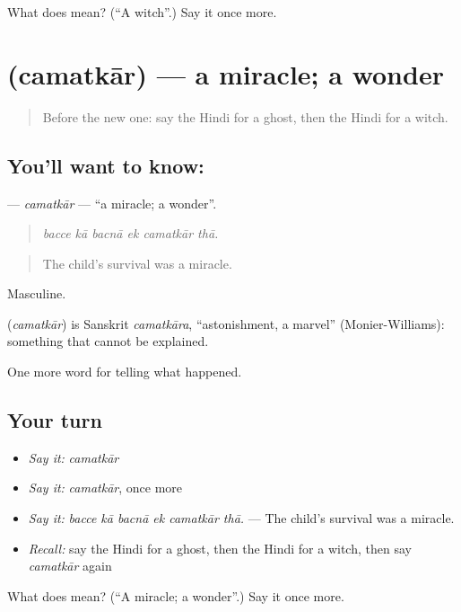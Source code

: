 \begin{tcolorbox}[breakable,colback=teal!4,colframe=teal!35!black,title={Before you move on}]
What does  mean? (\textquotedblleft{}A witch\textquotedblright{}.) Say it once more.
\end{tcolorbox}
\section[\texorpdfstring{\hi{चमत्कार} (camatkār)}{चमत्कार (camatkār)}]{ (camatkār) — a miracle; a wonder}

\label{lesson:HI-C338-camatkar}



\begin{quote}
Before the new one: say the Hindi for a ghost, then the Hindi for a witch.
\end{quote}

\subsection*{You'll want to know: }
\textbf{} — \emph{camatkār} — \textquotedblleft{}a miracle; a wonder\textquotedblright{}.

\begin{quote}
     
\end{quote}

\begin{quote}
\emph{bacce kā bacnā ek camatkār thā.}
\end{quote}

\begin{quote}
The child's survival was a miracle.
\end{quote}

Masculine.

\begin{cousinweb}
\textbf{} (\emph{camatkār}) is Sanskrit \emph{camatkāra}, \textquotedblleft{}astonishment, a marvel\textquotedblright{} (Monier-Williams): something that cannot be explained.
\end{cousinweb}

\begin{grammarlens}[title={What you've built}]
One more word for telling what happened.
\end{grammarlens}

\subsection*{Your turn}
\begin{itemize}
\raggedright
  \item \emph{Say it:} \emph{camatkār}
  \item \emph{Say it:} \emph{camatkār}, once more
  \item \emph{Say it:} \emph{bacce kā bacnā ek camatkār thā.} — The child's survival was a miracle.
  \item \emph{Recall:} say the Hindi for a ghost, then the Hindi for a witch, then say \emph{camatkār} again
\end{itemize}

\begin{tcolorbox}[breakable,colback=teal!4,colframe=teal!35!black,title={Before you move on}]
What does  mean? (\textquotedblleft{}A miracle; a wonder\textquotedblright{}.) Say it once more.
\end{tcolorbox}
